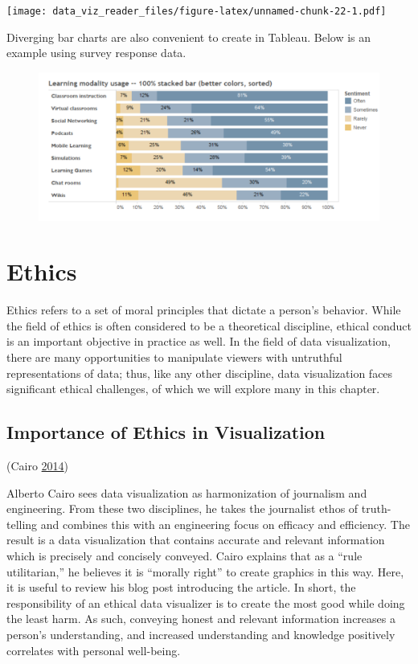 \documentclass[]{book}
\begin{document}
\texttt{[image: data\_viz\_reader\_files/figure-latex/unnamed-chunk-22-1.pdf]}

Diverging bar charts are also convenient to create in Tableau. Below is
an example using survey response data.

\begin{figure}
\centering
\includegraphics{images/diverging_bar.png}
\caption{}
\end{figure}

\chapter{Ethics}\label{ethics}

Ethics refers to a set of moral principles that dictate a person's
behavior. While the field of ethics is often considered to be a
theoretical discipline, ethical conduct is an important objective in
practice as well. In the field of data visualization, there are many
opportunities to manipulate viewers with untruthful representations of
data; thus, like any other discipline, data visualization faces
significant ethical challenges, of which we will explore many in this
chapter.

\section{Importance of Ethics in
Visualization}\label{importance-of-ethics-in-visualization}

(Cairo \protect\hyperlink{ref-ethical_infographics}{2014})

Alberto Cairo sees data visualization as harmonization of journalism and
engineering. From these two disciplines, he takes the journalist ethos
of truth-telling and combines this with an engineering focus on efficacy
and efficiency. The result is a data visualization that contains
accurate and relevant information which is precisely and concisely
conveyed. Cairo explains that as a ``rule utilitarian,'' he believes it
is ``morally right'' to create graphics in this way. Here, it is useful
to review his blog post introducing the article. In short, the
responsibility of an ethical data visualizer is to create the most good
while doing the least harm. As such, conveying honest and relevant
information increases a person's understanding, and increased
understanding and knowledge positively correlates with personal
well-being.
\end{document}
